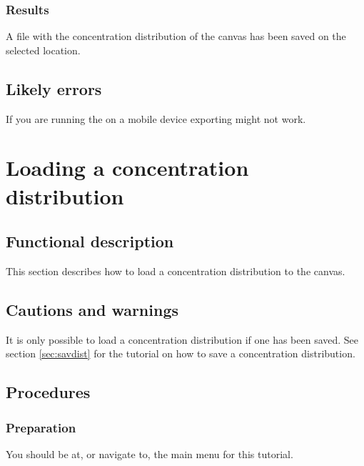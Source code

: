 \subsubsection{Results}
A file with the concentration distribution of the canvas has been saved on the selected location.

\subsection{Likely errors}
If you are running the \applicationname on a mobile device exporting might not work.


\section{Loading a concentration distribution}
\label{sec:loadDist}

\subsection{Functional description}
This section describes how to load a concentration distribution to the canvas.

\subsection{Cautions and warnings}
It is only possible to load a concentration distribution if one has been saved. See section \ref{sec:savdist} for the tutorial on how to save a concentration distribution.

\subsection{Procedures}
\subsubsection{Preparation}
You should be at, or navigate to, the main menu for this tutorial.

